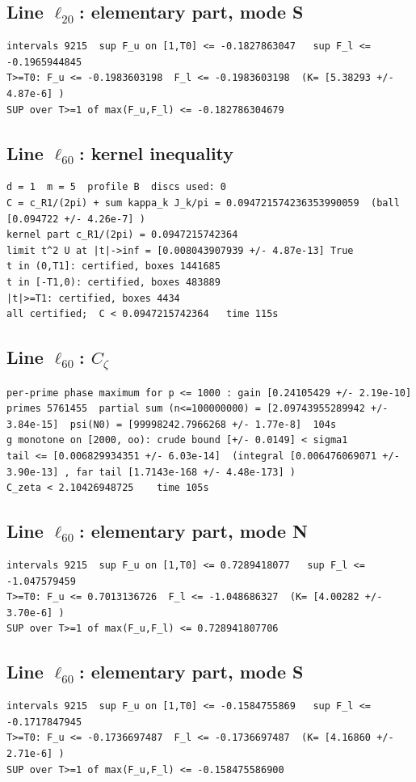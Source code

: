 \documentclass[11pt,reqno]{amsart}
\numberwithin{equation}{section}
\theoremstyle{definition}
\theoremstyle{remark}
\begin{document}
\subsection*{Line $\ell_{20}$: elementary part, mode S}
\begin{lstlisting}
intervals 9215  sup F_u on [1,T0] <= -0.1827863047   sup F_l <= -0.1965944845
T>=T0: F_u <= -0.1983603198  F_l <= -0.1983603198  (K= [5.38293 +/- 4.87e-6] )
SUP over T>=1 of max(F_u,F_l) <= -0.182786304679
\end{lstlisting}
\subsection*{Line $\ell_{60}$: kernel inequality}
\begin{lstlisting}
d = 1  m = 5  profile B  discs used: 0
C = c_R1/(2pi) + sum kappa_k J_k/pi = 0.094721574236353990059  (ball [0.094722 +/- 4.26e-7] )
kernel part c_R1/(2pi) = 0.0947215742364
limit t^2 U at |t|->inf = [0.008043907939 +/- 4.87e-13] True
t in (0,T1]: certified, boxes 1441685
t in [-T1,0): certified, boxes 483889
|t|>=T1: certified, boxes 4434
all certified;  C < 0.0947215742364   time 115s
\end{lstlisting}
\subsection*{Line $\ell_{60}$: $C_\zeta$}
\begin{lstlisting}
per-prime phase maximum for p <= 1000 : gain [0.24105429 +/- 2.19e-10]
primes 5761455  partial sum (n<=100000000) = [2.09743955289942 +/- 3.84e-15]  psi(N0) = [99998242.7966268 +/- 1.77e-8]  104s
g monotone on [2000, oo): crude bound [+/- 0.0149] < sigma1
tail <= [0.006829934351 +/- 6.03e-14]  (integral [0.006476069071 +/- 3.90e-13] , far tail [1.7143e-168 +/- 4.48e-173] )
C_zeta < 2.10426948725    time 105s
\end{lstlisting}
\subsection*{Line $\ell_{60}$: elementary part, mode N}
\begin{lstlisting}
intervals 9215  sup F_u on [1,T0] <= 0.7289418077   sup F_l <= -1.047579459
T>=T0: F_u <= 0.7013136726  F_l <= -1.048686327  (K= [4.00282 +/- 3.70e-6] )
SUP over T>=1 of max(F_u,F_l) <= 0.728941807706
\end{lstlisting}
\subsection*{Line $\ell_{60}$: elementary part, mode S}
\begin{lstlisting}
intervals 9215  sup F_u on [1,T0] <= -0.1584755869   sup F_l <= -0.1717847945
T>=T0: F_u <= -0.1736697487  F_l <= -0.1736697487  (K= [4.16860 +/- 2.71e-6] )
SUP over T>=1 of max(F_u,F_l) <= -0.158475586900
\end{lstlisting}
\end{document}
